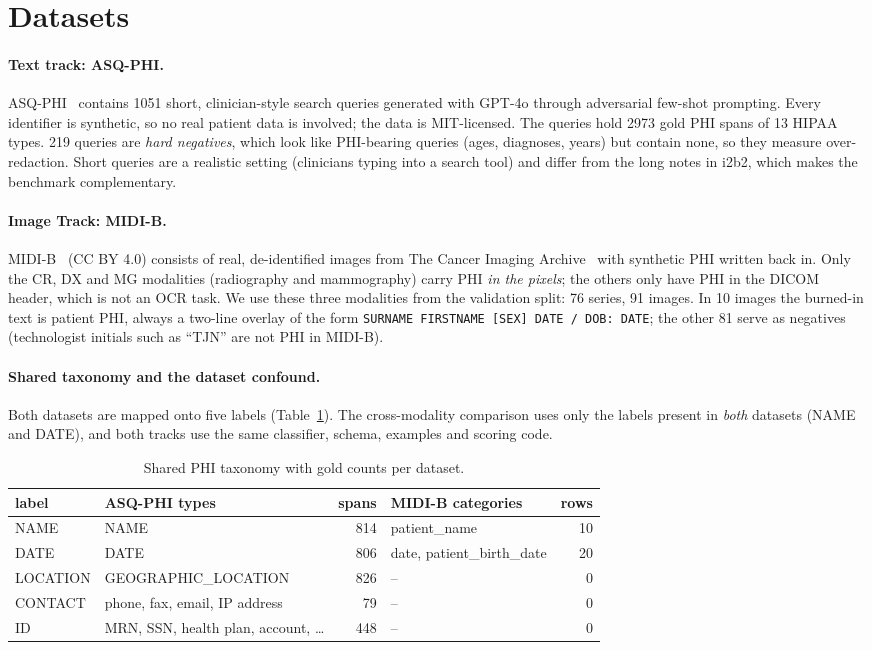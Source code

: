 \documentclass[11pt,a4paper]{article}
\begin{document}
\section{Datasets}

\paragraph{Text track: ASQ-PHI.} ASQ-PHI~\cite{asqphi,asqphidata} contains 1051 short, clinician-style search queries generated with GPT-4o through adversarial few-shot prompting. Every identifier is synthetic, so no real patient data is involved; the data is MIT-licensed. The queries hold 2973 gold PHI spans of 13 HIPAA types. 219 queries are \emph{hard negatives}, which look like PHI-bearing queries (ages, diagnoses, years) but contain none, so they measure over-redaction. Short queries are a realistic setting (clinicians typing into a search tool) and differ from the long notes in i2b2, which makes the benchmark complementary.

\paragraph{Image Track: MIDI-B.} MIDI-B~\cite{midib} (CC BY 4.0) consists of real, de-identified images from The Cancer Imaging Archive~\cite{tcia} with synthetic PHI written back in. Only the CR, DX and MG modalities (radiography and mammography) carry PHI \emph{in the pixels}; the others only have PHI in the DICOM header, which is not an OCR task. We use these three modalities from the validation split: 76 series, 91 images. In 10 images the burned-in text is patient PHI, always a two-line overlay of the form \texttt{SURNAME FIRSTNAME [SEX] DATE / DOB: DATE}; the other 81 serve as negatives (technologist initials such as ``TJN'' are not PHI in MIDI-B).

\paragraph{Shared taxonomy and the dataset confound.} Both datasets are mapped onto five labels (Table~\ref{tab:taxonomy}). The cross-modality comparison uses only the labels present in \emph{both} datasets (NAME and DATE), and both tracks use the same classifier, schema, examples and scoring code.

\begin{table}[H]
\centering\small
\begin{tabular}{llrlr}
\toprule
label & ASQ-PHI types & spans & MIDI-B categories & rows \\
\midrule
NAME     & NAME & 814 & patient\_name & 10 \\
DATE     & DATE & 806 & date, patient\_birth\_date & 20 \\
LOCATION & GEOGRAPHIC\_LOCATION & 826 & -- & 0 \\
CONTACT  & phone, fax, email, IP address & 79 & -- & 0 \\
ID       & MRN, SSN, health plan, account, \ldots & 448 & -- & 0 \\
\bottomrule
\end{tabular}
\caption{Shared PHI taxonomy with gold counts per dataset.}
\label{tab:taxonomy}
\end{table}
\end{document}
